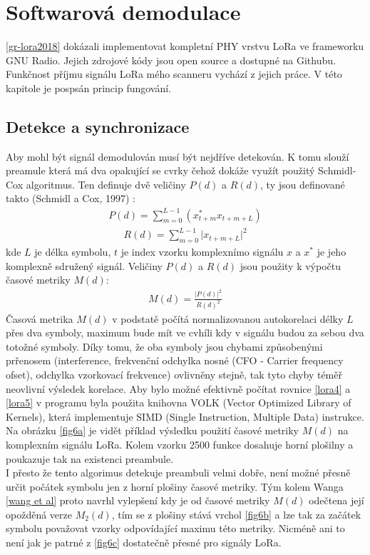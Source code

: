\documentclass{ctuthesis}
\begin{document}
\section{Softwarová demodulace}
\ref{gr-lora2018} dokázali implementovat kompletní PHY vrstvu LoRa ve frameworku GNU Radio. Jejich zdrojové kódy jsou open source a dostupné na Githubu. Funkčnost příjmu signálu LoRa mého scanneru vychází z jejich práce. V této kapitole je pospsán princip fungování.
\subsection{Detekce a synchronizace}
\label{subsec:detection}
Aby mohl být signál demodulován musí být nejdříve detekován. K tomu slouží preamule která má dva opakující se cvrky čehož dokáže využít použitý Schmidl-Cox algoritmus. Ten definuje dvě veličiny $P(d)$ a $R(d)$, ty jsou definované takto (Schmidl a Cox, 1997) \cite{schmidlcox1997}:
\begin{align}P(d) = \sum_{m=0}^{L-1} (x_{t+m}^{\ast}x_{t+m+L})
\label{eq:lora3}
\end{align}
\begin{align}
R(d) = \sum_{m=0}^{L-1} \lvert{x_{t+m+L}}\rvert^{2}
\label{eq:lora4}
\end{align}
kde $L$ je délka symbolu, $t$ je index vzorku komplexnímo signálu $x$ a $x^{\ast}$ je jeho komplexně sdružený signál. Veličiny $P(d)$ a $R(d)$ jsou použity k výpočtu časové metriky $M(d)$:
\begin{align}
M(d) = \frac{\vert P(d) \rvert ^{2}}{R(d)^{2}}
\label{eq:lora5}
\end{align}
Časová metrika $M(d)$ v podstatě počítá normalizovanou autokorelaci délky $L$ přes dva symboly, maximum bude mít ve cvhíli kdy v signálu budou za sebou dva totožné symboly. Díky tomu, že oba symboly jsou chybami způsobenými prřenosem (interference, frekvenční odchylka nosné (CFO - Carrier frequency ofset), odchylka vzorkovací frekvence) ovlivněny stejně, tak tyto chyby téměř neovlivní výsledek korelace. Aby bylo možné efektivně počítat rovnice \ref{lora4} a \ref{lora5} v programu byla použita knihovna VOLK (Vector Optimized Library of Kernels), která implementuje SIMD (Single Instruction, Multiple Data) instrukce. Na obrázku \ref{fig6a} je vidět příklad výsledku použití časové metriky $M(d)$ na komplexním signálu LoRa. Kolem vzorku 2500 funkce dosahuje horní plošilny a poukazuje tak na existenci preambule. \\
I přesto že tento algorimus detekuje preambuli velmi dobře, není možné přesně určit počátek symbolu jen z horní plošiny časové metriky. Tým kolem Wanga \ref{wang et al} proto navrhl vylepšení kdy je od časové metriky $M(d)$ odečtena její opožděná verze $M_{2}(d)$, tím se z plošiny stává vrchol \ref{fig6b} a lze tak za začátek symbolu považovat vzorky odpovídající maximu této metriky. Nicméně ani to není jak je patrné z \ref{fig6c} dostatečně přesné pro signály LoRa.\\
\end{document}
